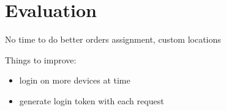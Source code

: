 \chapter{Evaluation}




No time to do better orders assignment, custom locations

Things to improve:
\begin{itemize}
	\item login on more devices at time
	\item generate login token with each request 
\end{itemize}